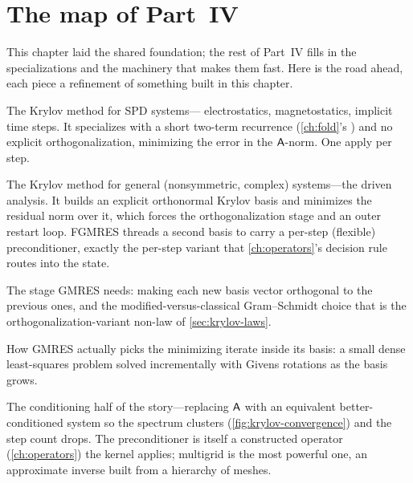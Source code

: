 \section{The map of Part~IV}
\label{sec:krylov-map}

This chapter laid the shared foundation; the rest of Part~IV fills in the
specializations and the machinery that makes them fast. Here is the road ahead, each
piece a refinement of something built in this chapter.

\begin{description}[style=nextline, leftmargin=1.4em]
  \item[Conjugate gradients (\cref{ch:cg}).] The Krylov method for SPD systems---
  electrostatics, magnetostatics, implicit time steps. It specializes
   with a short two-term recurrence (\cref{ch:fold}'s
  ) and no explicit orthogonalization, minimizing
  the error in the $\mathsf{A}$-norm. One apply per step.
  \item[GMRES and FGMRES (\cref{ch:gmres}).] The Krylov method for general
  (nonsymmetric, complex) systems---the driven analysis. It builds an explicit
  orthonormal Krylov basis and minimizes the residual norm over it, which forces the
  orthogonalization stage and an outer restart loop. FGMRES threads a second basis to
  carry a per-step (flexible) preconditioner, exactly the per-step variant that
  \cref{ch:operators}'s decision rule routes into the state.
  \item[Orthogonalization (\cref{ch:orthog}).] The stage GMRES needs: making each new
  basis vector orthogonal to the previous ones, and the modified-versus-classical
  Gram--Schmidt choice that is the orthogonalization-variant non-law of
  \cref{sec:krylov-laws}.
  \item[The least-squares core (\cref{ch:givens}).] How GMRES actually picks the
  minimizing iterate inside its basis: a small dense least-squares problem solved
  incrementally with Givens rotations as the basis grows.
  \item[Preconditioning and multigrid (\cref{ch:precond,ch:multigrid}).] The
  conditioning half of the story---replacing $\mathsf{A}$ with an equivalent
  better-conditioned system so the spectrum clusters (\cref{fig:krylov-convergence})
  and the step count drops. The preconditioner is itself a constructed operator
  (\cref{ch:operators}) the kernel applies; multigrid is the most powerful one, an
  approximate inverse built from a hierarchy of meshes.
\end{description}

